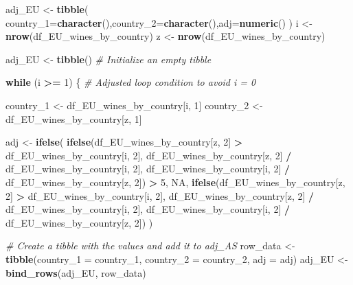 \documentclass[
]{article}
\newenvironment{Shaded}{\begin{snugshade}}{\end{snugshade}}
\newcommand{\AttributeTok}[1]{\textcolor[rgb]{0.13,0.29,0.53}{#1}}
\newcommand{\CommentTok}[1]{\textcolor[rgb]{0.56,0.35,0.01}{\textit{#1}}}
\newcommand{\ConstantTok}[1]{\textcolor[rgb]{0.56,0.35,0.01}{#1}}
\newcommand{\ControlFlowTok}[1]{\textcolor[rgb]{0.13,0.29,0.53}{\textbf{#1}}}
\newcommand{\DecValTok}[1]{\textcolor[rgb]{0.00,0.00,0.81}{#1}}
\newcommand{\FunctionTok}[1]{\textcolor[rgb]{0.13,0.29,0.53}{\textbf{#1}}}
\newcommand{\NormalTok}[1]{#1}
\newcommand{\OtherTok}[1]{\textcolor[rgb]{0.56,0.35,0.01}{#1}}
\newcommand{\SpecialCharTok}[1]{\textcolor[rgb]{0.81,0.36,0.00}{\textbf{#1}}}
\begin{document}
\begin{Shaded}
\begin{Highlighting}[]
\NormalTok{adj\_EU }\OtherTok{\textless{}{-}} \FunctionTok{tibble}\NormalTok{( }\AttributeTok{country\_1=}\FunctionTok{character}\NormalTok{(),}\AttributeTok{country\_2=}\FunctionTok{character}\NormalTok{(),}\AttributeTok{adj=}\FunctionTok{numeric}\NormalTok{()}
\NormalTok{)}
\NormalTok{i }\OtherTok{\textless{}{-}} \FunctionTok{nrow}\NormalTok{(df\_EU\_wines\_by\_country)}
\NormalTok{z }\OtherTok{\textless{}{-}} \FunctionTok{nrow}\NormalTok{(df\_EU\_wines\_by\_country)}

\NormalTok{adj\_EU }\OtherTok{\textless{}{-}} \FunctionTok{tibble}\NormalTok{()  }\CommentTok{\# Initialize an empty tibble}

\ControlFlowTok{while}\NormalTok{ (i }\SpecialCharTok{\textgreater{}=} \DecValTok{1}\NormalTok{) \{  }\CommentTok{\# Adjusted loop condition to avoid i = 0}

\NormalTok{  country\_1 }\OtherTok{\textless{}{-}}\NormalTok{ df\_EU\_wines\_by\_country[i, }\DecValTok{1}\NormalTok{]}
\NormalTok{  country\_2 }\OtherTok{\textless{}{-}}\NormalTok{ df\_EU\_wines\_by\_country[z, }\DecValTok{1}\NormalTok{]}

\NormalTok{  adj }\OtherTok{\textless{}{-}} \FunctionTok{ifelse}\NormalTok{(}
    \FunctionTok{ifelse}\NormalTok{(df\_EU\_wines\_by\_country[z, }\DecValTok{2}\NormalTok{] }\SpecialCharTok{\textgreater{}}\NormalTok{ df\_EU\_wines\_by\_country[i, }\DecValTok{2}\NormalTok{],}
\NormalTok{           df\_EU\_wines\_by\_country[z, }\DecValTok{2}\NormalTok{] }\SpecialCharTok{/}\NormalTok{ df\_EU\_wines\_by\_country[i, }\DecValTok{2}\NormalTok{],}
\NormalTok{           df\_EU\_wines\_by\_country[i, }\DecValTok{2}\NormalTok{] }\SpecialCharTok{/}\NormalTok{ df\_EU\_wines\_by\_country[z, }\DecValTok{2}\NormalTok{]) }\SpecialCharTok{\textgreater{}} \DecValTok{5}\NormalTok{,}
    \ConstantTok{NA}\NormalTok{,}
    \FunctionTok{ifelse}\NormalTok{(df\_EU\_wines\_by\_country[z, }\DecValTok{2}\NormalTok{] }\SpecialCharTok{\textgreater{}}\NormalTok{ df\_EU\_wines\_by\_country[i, }\DecValTok{2}\NormalTok{],}
\NormalTok{           df\_EU\_wines\_by\_country[z, }\DecValTok{2}\NormalTok{] }\SpecialCharTok{/}\NormalTok{ df\_EU\_wines\_by\_country[i, }\DecValTok{2}\NormalTok{],}
\NormalTok{           df\_EU\_wines\_by\_country[i, }\DecValTok{2}\NormalTok{] }\SpecialCharTok{/}\NormalTok{ df\_EU\_wines\_by\_country[z, }\DecValTok{2}\NormalTok{])}
\NormalTok{  )}

  \CommentTok{\# Create a tibble with the values and add it to adj\_AS}
\NormalTok{  row\_data }\OtherTok{\textless{}{-}} \FunctionTok{tibble}\NormalTok{(}\AttributeTok{country\_1 =}\NormalTok{ country\_1, }\AttributeTok{country\_2 =}\NormalTok{ country\_2, }\AttributeTok{adj =}\NormalTok{ adj)}
\NormalTok{  adj\_EU }\OtherTok{\textless{}{-}} \FunctionTok{bind\_rows}\NormalTok{(adj\_EU, row\_data)}


\end{Highlighting}
\end{Shaded}
\end{document}
